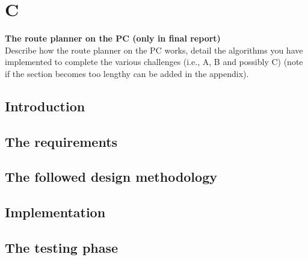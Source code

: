 \chapter{C}

\textbf{The route planner on the PC (only in final report)} \\
Describe how the route planner on the PC works, detail the algorithms you have implemented to complete the various challenges (i.e., A, B and possibly C) (note if the section becomes too lengthy can be added in the appendix).

\section{Introduction}

\section{The requirements}

\section{The followed design methodology}

\section{Implementation}

\section{The testing phase}
